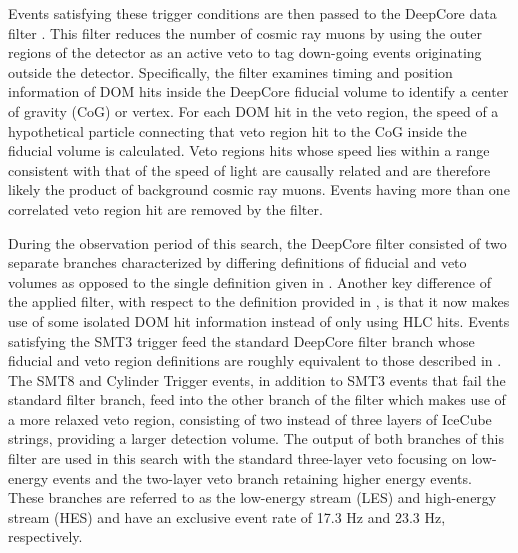 \documentclass[manuscript]{aastex}
\begin{document}
Events satisfying these trigger conditions are then passed to the DeepCore data filter \citep{2012APh....35..615A}. This filter reduces the number of cosmic ray muons by using the outer regions of the detector as an active veto to tag down-going events originating outside the detector. Specifically, the filter examines timing and position information of DOM hits inside the DeepCore fiducial volume to identify a center of gravity (CoG) or vertex. For each DOM hit in the veto region, the speed of a hypothetical particle connecting that veto region hit to the CoG inside the fiducial volume is calculated. Veto regions hits whose speed lies within a range consistent with that of the speed of light are causally related and are therefore likely the product of background cosmic ray muons. Events having more than one correlated veto region hit are removed by the filter.

During the observation period of this search, the DeepCore filter consisted of two separate branches characterized by differing definitions of fiducial and veto volumes as opposed to the single definition given in \cite{2012APh....35..615A}. Another key difference of the applied filter, with respect to the definition provided in \cite{2012APh....35..615A}, is that it now makes use of some isolated DOM hit information instead of only using HLC hits. Events satisfying the SMT3 trigger feed the standard DeepCore filter branch whose fiducial and veto region definitions are roughly equivalent to those described in \cite{2012APh....35..615A}. The SMT8 and Cylinder Trigger events, in addition to SMT3 events that fail the standard filter branch, feed into the other branch of the filter which makes use of a more relaxed veto region, consisting of two instead of three layers of IceCube strings, providing a larger detection volume. The output of both branches of this filter are used in this search with the standard three-layer veto focusing on low-energy events and the two-layer veto branch retaining higher energy events. These branches are referred to as the low-energy stream (LES) and high-energy stream (HES) and have an exclusive event rate of 17.3 Hz and 23.3 Hz, respectively.
\end{document}
